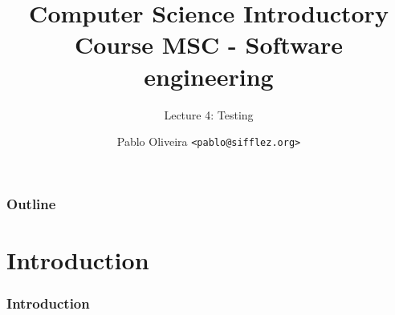 \documentclass[10pt]{beamer}
\title{Computer Science Introductory Course MSC - Software engineering}
\subtitle{Lecture 4: Testing}
\author[Pablo Oliveira]{Pablo Oliveira \texttt{<pablo@sifflez.org>}}
\institute{ENST}
\date{}
\begin{document}
\begin{frame}
  \titlepage
\end{frame}

\begin{frame}
  \frametitle{Outline}
  \tableofcontents
\end{frame}

\section{Introduction}
\begin{frame}
\frametitle{Introduction}
\end{frame}
\end{document}

